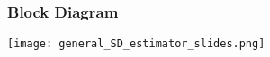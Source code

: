 \begin{frame}
  \frametitle{Block Diagram}

    \begin{center}
      \texttt{[image: general\_SD\_estimator\_slides.png]}
    \end{center}

    




\end{frame}


